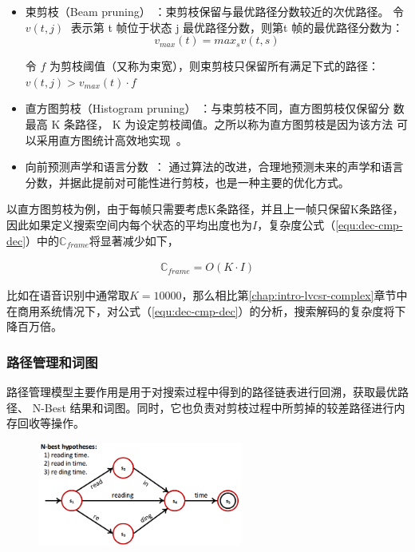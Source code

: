 \begin{itemize}
\item 束剪枝（Beam pruning） ：束剪枝保留与最优路径分数较近的次优路径。
令 $v(t,j)$ 表示第 t 帧位于状态 j 最优路径分数，则第t 帧的最优路径分数为：
\begin{equation}
v_{max}(t)=max_s v(t,s)
\end{equation}

令 $f$ 为剪枝阈值（又称为束宽），则束剪枝只保留所有满足下式的路径：
$v(t,j)>v_{max}(t)\cdot f$
\item 直方图剪枝（Histogram pruning） ：与束剪枝不同，直方图剪枝仅保留分
数最高 K 条路径， K 为设定剪枝阈值。之所以称为直方图剪枝是因为该方法
可以采用直方图统计高效地实现~\cite{pylkkonen2005new}。

\item 向前预测声学和语言分数~\cite{soltau2009dynamic,nolden2012search}：
通过算法的改进，合理地预测未来的声学和语言分数，并据此提前对可能性进行剪枝，也是一种主要的优化方式。
\end{itemize}

以直方图剪枝为例，由于每帧只需要考虑K条路径，并且上一帧只保留K条路径，因此如果定义搜索空间内每个状态的平均出度也为$I$，复杂度公式（\ref{equ:dec-cmp-dec}）中的$\mathbb{C}_{frame}$将显著减少如下，

\begin{equation}
\label{equ:dec-cmp-space2}
 \begin{split}
\mathbb{C}_{frame} = O(K \cdot I )
 \end{split}
\end{equation}

比如在语音识别中通常取$K=10000$，那么相比第\ref{chap:intro-lvcsr-complex}章节中在商用系统情况下，对公式（\ref{equ:dec-cmp-dec}）的分析，搜索解码的复杂度将下降百万倍。

\subsubsection{路径管理和词图}
\label{sec:intro-lattice}


路径管理模型主要作用是用于对搜索过程中得到的路径链表进行回溯，获取最优路径、
N-Best 结果和词图。同时，它也负责对剪枝过程中所剪掉的较差路径进行内存回收等操作。

\begin{figure}[!htp]
  \centering
    \captionstyle{\centering}
    \includegraphics[clip=true, width=0.6\textwidth]{figure/lattice.png}
\end{figure}


